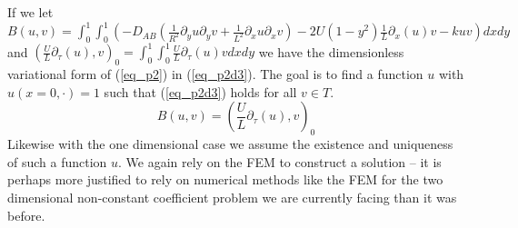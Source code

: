 \documentclass[11pt,fleqn]{article}
\theoremstyle{defstyle}
\begin{document}
If we let $B(u,v) = \int_0^1 \int_0^1 \left(-D_{AB}\left(\frac{1}{R^2}\partial_y u \partial_y v + \frac{1}{L^2}\partial_x u \partial_xv\right) - 2U\left(1-y^2\right)\frac{1}{L}\partial_x(u) v - kuv\right)dxdy$ and $\left(\frac{U}{L} \partial_\tau (u), v\right)_0 = \int_0^1 \int_0^1 \frac{U}{L} \partial_\tau (u) v dxdy$ we have the dimensionless variational form of (\ref{eq_p2}) in (\ref{eq_p2d3}). The goal is to find a function $u$ with $u(x=0,\cdot) = 1$ such that (\ref{eq_p2d3}) holds for all $v \in T$.
\begin{equation}
B(u,v) = \left(\frac{U}{L} \partial_\tau (u), v\right)_0
\label{eq_p2d3}
\end{equation}
Likewise with the one dimensional case we assume the existence and uniqueness of such a function $u$. We again rely on the FEM to construct a solution -- it is perhaps more justified to rely on numerical methods like the FEM for the two dimensional non-constant coefficient problem we are currently facing than it was before.
\end{document}
